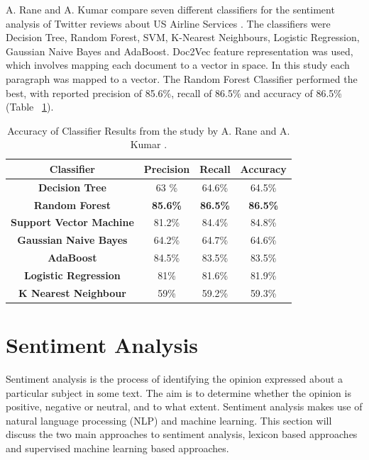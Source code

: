 A. Rane and A. Kumar compare seven different classifiers for the sentiment analysis of Twitter reviews about US Airline Services \cite{Rane2018}. The classifiers were Decision Tree, Random Forest, SVM, K-Nearest Neighbours, Logistic Regression, Gaussian Naive Bayes and AdaBoost. Doc2Vec feature representation was used, which involves mapping each document to a vector in space. In this study each paragraph was mapped to a vector. The Random Forest Classifier performed the best, with reported precision of 85.6\%, recall of 86.5\% and accuracy of 86.5\% (Table ~\ref{Table:arane}). 
\begin{table}[h!]
\centering
\caption{Accuracy of Classifier Results from the study by A. Rane and A. Kumar \cite{Rane2018}.}
\label{Table:arane}
\setlength\extrarowheight{5pt}
\begin{tabular}{|c|c|c|c|}
\hline
\textbf{Classifier} & \textbf{Precision} & \textbf{Recall} & \textbf{Accuracy} \\ \hline
\textbf{Decision Tree}          & 63 \%              & 64.6\%          & 64.5\%            \\ \hline
\textbf{Random Forest}          & \textbf{85.6\%}    & \textbf{86.5\%} & \textbf{86.5\%}   \\ \hline
\textbf{Support Vector Machine} & 81.2\%             & 84.4\%          & 84.8\%            \\ \hline
\textbf{Gaussian Naive Bayes}   & 64.2\%             & 64.7\%          & 64.6\%            \\ \hline
\textbf{AdaBoost}               & 84.5\%             & 83.5\%          & 83.5\%            \\ \hline
\textbf{Logistic Regression}    & 81\%               & 81.6\%          & 81.9\%            \\ \hline
\textbf{K Nearest Neighbour}    & 59\%               & 59.2\%          & 59.3\%            \\ \hline
\end{tabular}
\end{table}

\section{Sentiment Analysis}

Sentiment analysis is the process of identifying the opinion expressed about a particular subject in some text. The aim is to determine whether the opinion is positive, negative or neutral, and to what extent. Sentiment analysis makes use of natural language processing (NLP) and machine learning. This section will discuss the two main approaches to sentiment analysis, lexicon based approaches and supervised machine learning based approaches. 

